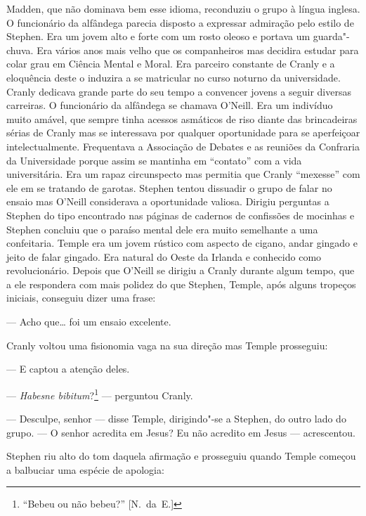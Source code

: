 Madden, que não dominava bem esse idioma, reconduziu o grupo à língua inglesa.
O funcionário da alfândega parecia disposto a expressar admiração pelo estilo
de Stephen.  Era um jovem alto e forte com um rosto oleoso e portava um
\label{guarda"-chuva} guarda"-chuva.  Era vários anos mais 
velho que os companheiros mas decidira estudar para colar grau em Ciência Mental e Moral.  Era parceiro
constante de Cranly e a eloquência deste o induzira a se matricular no curso
noturno da universidade.  Cranly dedicava grande parte do seu tempo a convencer
jovens a \label{seguir"-diversas} seguir diversas carreiras.  O funcionário da alfândega se chamava
O’Neill.  Era um indivíduo muito amável, que sempre tinha acessos asmáticos de
riso diante das brincadeiras sérias de Cranly mas se interessava por qualquer
oportunidade para se aperfeiçoar intelectualmente.  Frequentava a Associação de
Debates e as reuniões da Confraria da Universidade porque assim se mantinha em
“contato” com a vida universitária.  Era um rapaz circunspecto mas permitia que
Cranly “mexesse” com ele em se tratando de garotas.  Stephen tentou dissuadir o
grupo de falar no ensaio mas O’Neill considerava a oportunidade valiosa.
Dirigiu perguntas a Stephen do tipo encontrado nas páginas de cadernos de
confissões de mocinhas e Stephen concluiu que o paraíso mental dele era muito
semelhante a uma confeitaria.  Temple era um jovem rústico com aspecto de
cigano, andar gingado e jeito de falar gingado.  Era natural do Oeste da
Irlanda e conhecido como revolucionário.  Depois que O’Neill se dirigiu a
Cranly durante algum tempo, que a ele respondera com mais polidez do que
Stephen, Temple, após alguns tropeços iniciais, conseguiu dizer uma frase:

--- Acho que\ldots{} foi um ensaio excelente.

Cranly voltou uma fisionomia vaga na sua direção mas Temple
prosseguiu:

--- E captou a atenção deles.

--- \textit{Habesne bibitum}?\footnote{ ``Bebeu ou não bebeu?'' [N.~da~E.]} --- perguntou Cranly.

--- Desculpe, senhor --- disse Temple, dirigindo"-se a Stephen, do
outro lado do grupo.  --- O senhor acredita em Jesus?  Eu não acredito em Jesus
--- acrescentou.

Stephen riu alto do tom daquela afirmação e prosseguiu quando Temple começou a
balbuciar uma espécie de apologia:

